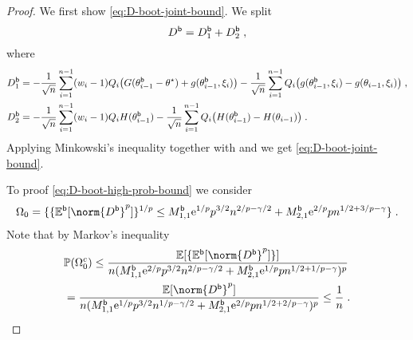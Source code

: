 \begin{proof}
We first show \eqref{eq:D-boot-joint-bound}. We split 
\[
D^{\mathsf{b}} = D^{\mathsf{b}}_{1} + D^{\mathsf{b}}_{2}\;,
\]
where 
\begin{equation}
\begin{split}
D^{\mathsf{b}}_{1} &= -\frac{1}{\sqrt{n}}\sum_{i=1}^{n-1}(w_i-1) Q_{i}\bigl( G(\theta_{i-1}^{\mathsf{b}}-\theta^\star) + g(\theta_{i-1}^{\mathsf{b}}, \xi_i)\bigr) - \frac{1}{\sqrt{n}}\sum_{i=1}^{n-1}Q_i\bigl(g(\theta_{i-1}^{\mathsf{b}}, \xi_i) -g(\theta_{i-1}, \xi_i)\bigr)\;, \\
D^{\mathsf{b}}_{2} &= -\frac{1}{\sqrt{n}}\sum_{i=1}^{n-1}(w_i-1) Q_{i} H(\theta_{i-1}^{\mathsf{b}}) - \frac{1}{\sqrt{n}}\sum_{i=1}^{n-1}Q_i\bigl(H(\theta_{i-1}^{\mathsf{b}})-  H(\theta_{i-1})\bigr)\;.
\end{split}
\end{equation}
Applying Minkowski's inequality together with  and  we get \eqref{eq:D-boot-joint-bound}.

To proof \eqref{eq:D-boot-high-prob-bound} we consider 
\begin{equation}
    \Omega_0 =\{\{\PEb[\norm{D^\boot}^{p}]\}^{1/p} \leq M_{1,1}^{\boot}\rme^{1/p}p^{3/2}n^{2/p-\gamma/2} +  M_{2,1}^{\boot}\rme^{2/p}p n^{1/2+3/p-\gamma}\}\eqsp.
\end{equation}
Note that by Markov's inequality 
\begin{align}
    &\PP(\Omega_0^c) \leq \frac{\PE[\{\PEb[\norm{D^\boot}^{p}]\}]}{n(M_{1,1}^{\boot}\rme^{2/p}p^{3/2}n^{2/p-\gamma/2} +  M_{2,1}^{\boot}\rme^{1/p}p n^{1/2+1/p-\gamma})^p}\\& = 
    \frac{\PE[\norm{D^\boot}^{p}]}{n(M_{1,1}^{\boot}\rme^{1/p}p^{3/2}n^{1/p-\gamma/2} +  M_{2,1}^{\boot}\rme^{2/p}p n^{1/2+2/p-\gamma})^p} \leq \frac{1}{n}\eqsp.
\end{align}

\end{proof}





